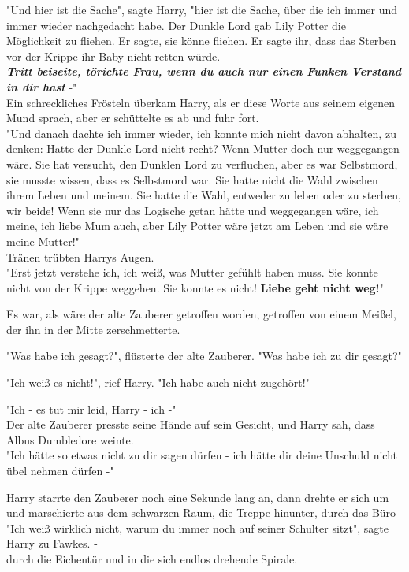 {"Und hier ist die Sache", sagte Harry, "hier ist die Sache, über die ich immer und immer wieder nachgedacht habe. Der Dunkle Lord gab Lily Potter die Möglichkeit zu fliehen. Er sagte, sie könne fliehen. Er sagte ihr, dass das Sterben vor der Krippe ihr Baby nicht retten würde.\\ \textbf{\emph{Tritt beiseite, törichte Frau, wenn du auch nur einen Funken Verstand in dir hast}} -"\\ Ein schreckliches Frösteln überkam Harry, als er diese Worte aus seinem eigenen Mund sprach, aber er schüttelte es ab und fuhr fort.\\ "Und danach dachte ich immer wieder, ich konnte mich nicht davon abhalten, zu denken: Hatte der Dunkle Lord nicht recht? Wenn Mutter doch nur weggegangen wäre. Sie hat versucht, den Dunklen Lord zu verfluchen, aber es war Selbstmord, sie musste wissen, dass es Selbstmord war. Sie hatte nicht die Wahl zwischen ihrem Leben und meinem. Sie hatte die Wahl, entweder zu leben oder zu sterben, wir beide! Wenn sie nur das Logische getan hätte und weggegangen wäre, ich meine, ich liebe Mum auch, aber Lily Potter wäre jetzt am Leben und sie wäre meine Mutter!"\\ Tränen trübten Harrys Augen.\\ "Erst jetzt verstehe ich, ich weiß, was Mutter gefühlt haben muss. Sie konnte nicht von der Krippe weggehen. Sie konnte es nicht! \textbf{Liebe geht nicht weg!}"

Es war, als wäre der alte Zauberer getroffen worden, getroffen von einem Meißel, der ihn in der Mitte zerschmetterte.

"Was habe ich gesagt?", flüsterte der alte Zauberer. "Was habe ich zu dir gesagt?"

"Ich weiß es nicht!", rief Harry. "Ich habe auch nicht zugehört!"

"Ich - es tut mir leid, Harry - ich -"\\ Der alte Zauberer presste seine Hände auf sein Gesicht, und Harry sah, dass Albus Dumbledore weinte.\\ "Ich hätte so etwas nicht zu dir sagen dürfen - ich hätte dir deine Unschuld nicht übel nehmen dürfen -"

Harry starrte den Zauberer noch eine Sekunde lang an, dann drehte er sich um und marschierte aus dem schwarzen Raum, die Treppe hinunter, durch das Büro -\\ "Ich weiß wirklich nicht, warum du immer noch auf seiner Schulter sitzt", sagte Harry zu Fawkes. -\\ durch die Eichentür und in die sich endlos drehende Spirale.

}
